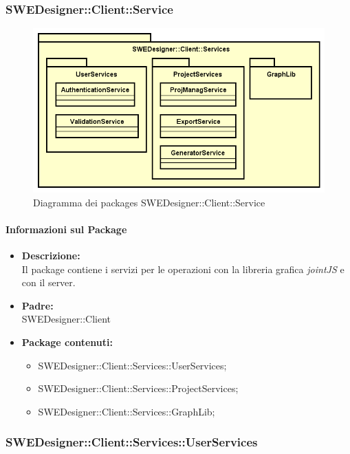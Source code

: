 \subsubsection{SWEDesigner::Client::Service}
		 \begin{figure}[h!]
		\centering
		\includegraphics[scale=0.4]{Disegnetti/SWEDesigner__Client__Services.png}
		\caption{Diagramma dei packages SWEDesigner::Client::Service}
 		\end{figure}
		\paragraph{Informazioni sul Package}
		\begin{itemize}
			\item \textbf{Descrizione: }\\
			Il package contiene i servizi per le operazioni con la libreria grafica
			\emph{jointJS} e con il server.
			\item \textbf{Padre: }\\ SWEDesigner::Client
			\item \textbf{Package contenuti: }
			\begin{itemize}
				\item SWEDesigner::Client::Services::UserServices;
				\item SWEDesigner::Client::Services::ProjectServices;
				\item SWEDesigner::Client::Services::GraphLib;
			\end{itemize}
		\end{itemize}

	\subsubsection{SWEDesigner::Client::Services::UserServices}

